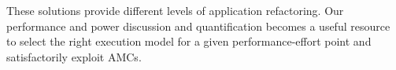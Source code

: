 These solutions provide different levels of application refactoring. 
Our performance and power discussion and quantification becomes a useful resource to select the right execution model for a given performance-effort point and satisfactorily exploit AMCs. 
\fi

%


